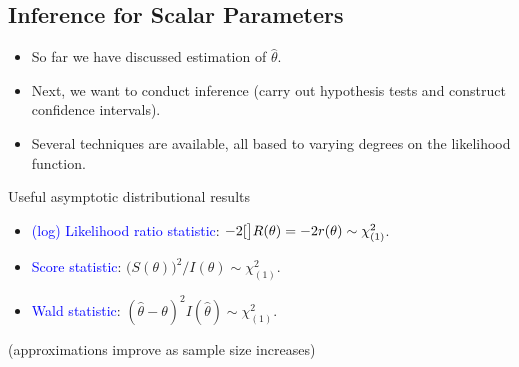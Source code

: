 \documentclass[oneside]{book}\usepackage[]{graphicx}\usepackage[svgnames]{xcolor}
\let\log\relax%
\begin{document}
\subsection*{Inference for Scalar Parameters}
\begin{itemize}
      \item So far we have discussed estimation of $ \hat{\theta} $.
      \item Next, we want to conduct inference (carry out hypothesis tests and construct
            confidence intervals).
      \item Several techniques are available, all based to varying degrees on the likelihood
            function.
\end{itemize}
\begin{Regular}{Useful asymptotic distributional results}
      \begin{itemize}
            \item \textcolor{Blue}{(log) Likelihood ratio statistic}: $ -2\log[\big]{R(\theta)}=-2r(\theta)\sim \chi^2_{(1)} $.
            \item \textcolor{Blue}{Score statistic}: $ \bigl(S(\theta)\bigr)^2/I(\theta) \sim \chi^2_{(1)} $.
            \item \textcolor{Blue}{Wald statistic}: $ (\hat{\theta}-\theta)^2 I(\hat{\theta}) \sim \chi^2_{(1)} $.
      \end{itemize}
      (approximations improve as sample size increases)
\end{Regular}
\end{document}
